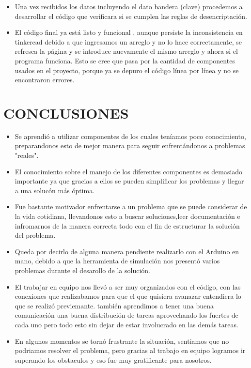\documentclass{article}
\begin{document}
\begin{itemize}
\item Una vez recibidos los datos incluyendo el dato bandera (clave) procedemos a desarrollar el código que verificara si se cumplen las reglas de desencriptación.

\item El código final ya está listo y funcional , aunque persiste la inconsistencia en tinkercad debido a que ingresamos un arreglo y no lo hace correctamente, se refresca la página y se introduce nuevamente el mismo arreglo y ahora si el programa funciona. Esto se cree que pasa por la cantidad de componentes usados en el proyecto, porque ya se depuro el código línea por línea y no se encontraron errores.


\end{itemize}

\newpage
\section{CONCLUSIONES}
\label{cONCLUSIONES}
\begin{itemize}
\item Se aprendió a utilizar componentes de los cuales teníamos poco conocimiento, preparandonos esto de mejor manera para seguir enfrentándonos a problemas "reales".
\\

\item El conocimiento sobre el manejo de los diferentes componentes es demasiado importante ya que gracias a ellos se pueden simplificar los problemas y llegar a una solucón más óptima.
\\

\item Fue bastante motivador enfrentarse a un problema que se puede considerar de la vida cotidiana, llevandonos esto a buscar soluciones,leer documentación e infromarnos de la manera correcta todo con el fin de estructurar la solución del problema.
\\

\item Queda por decirlo de alguna manera pendiente realizarlo con el Arduino en mano, debido a que la herramienta de simulación nos presentó varios problemas durante el desarollo de la solución.
\\
\item El trabajar en equipo nos llevó a ser muy organizados con el código, con las conexiones que realizabamos para que el que quisiera avanazar entendiera lo que se realizó previemante. también aprendimos a tener una buena comunicación una buena distribución de tareas aprovechando los fuertes de cada uno pero todo esto sin dejar de estar involucrado en las demás tareas.
\\
\item En algunos momentos se tornó frustrante la situación, sentiamos que no podriamos resolver el problema, pero gracias al trabajo en equipo logramos ir superando los obstaculos y eso fue muy gratificante para nosotros.




\end{itemize}
\end{document}
